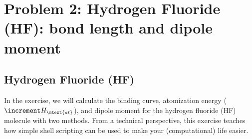 
\section{Problem 2: Hydrogen Fluoride (HF): bond length and dipole moment} \label{sec:problemII}

\subsection*{Hydrogen Fluoride (HF)}

In the exercise, we will calculate the binding curve, atomization energy (\( \increment H_\mtext{at} \)), and dipole moment for the hydrogen fluoride (HF) molecule with two methods. 
From a technical perspective, this exercise teaches how simple shell scripting can be used to make your (computational) life easier. 

